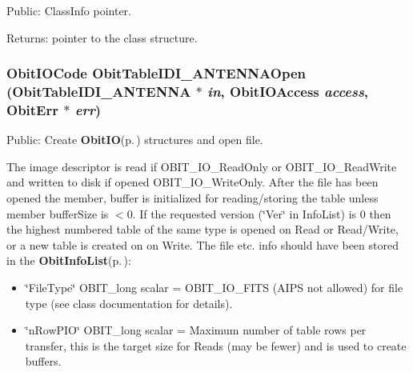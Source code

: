 Public: Class\-Info pointer. 

\begin{Desc}
\item[Returns:]pointer to the class structure. \end{Desc}
\subsubsection{\setlength{\rightskip}{0pt plus 5cm}Obit\-IOCode Obit\-Table\-IDI\_\-ANTENNAOpen ({\bf Obit\-Table\-IDI\_\-ANTENNA} $\ast$ {\em in}, Obit\-IOAccess {\em access}, {\bf Obit\-Err} $\ast$ {\em err})}\label{ObitTableIDI__ANTENNA_8h_a17}


Public: Create {\bf Obit\-IO}{\rm (p.\,\pageref{structObitIO})} structures and open file. 

The image descriptor is read if OBIT\_\-IO\_\-Read\-Only or OBIT\_\-IO\_\-Read\-Write and written to disk if opened OBIT\_\-IO\_\-Write\-Only. After the file has been opened the member, buffer is initialized for reading/storing the table unless member buffer\-Size is $<$0. If the requested version (\char`\"{}Ver\char`\"{} in Info\-List) is 0 then the highest numbered table of the same type is opened on Read or Read/Write, or a new table is created on on Write. The file etc. info should have been stored in the {\bf Obit\-Info\-List}{\rm (p.\,\pageref{structObitInfoList})}: \begin{itemize}
\item \char`\"{}File\-Type\char`\"{} OBIT\_\-long scalar = OBIT\_\-IO\_\-FITS (AIPS not allowed) for file type (see class documentation for details). \item \char`\"{}n\-Row\-PIO\char`\"{} OBIT\_\-long scalar = Maximum number of table rows per transfer, this is the target size for Reads (may be fewer) and is used to create buffers. 
\end{itemize}
